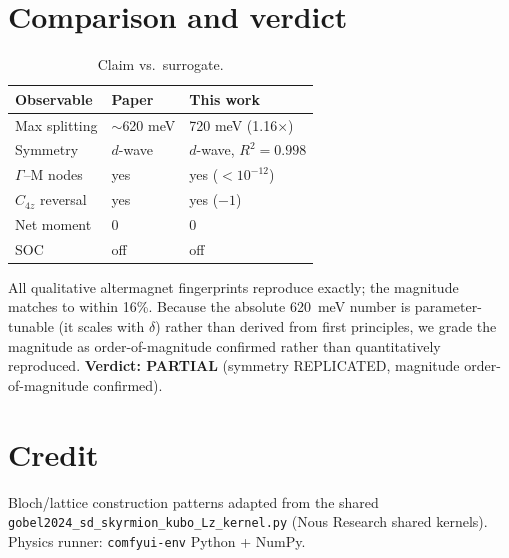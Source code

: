 \documentclass[aps,prb,twocolumn,superscriptaddress,floatfix]{revtex4-2}
\begin{document}
\section{Comparison and verdict}
\begin{table}[h]
\caption{Claim vs.\ surrogate.}
\begin{ruledtabular}
\begin{tabular}{lll}
Observable & Paper & This work \\\hline
Max splitting & $\sim$620 meV & 720 meV (1.16$\times$) \\
Symmetry & $d$-wave & $d$-wave, $R^2{=}0.998$ \\
$\Gamma$--M nodes & yes & yes ($<10^{-12}$) \\
$C_{4z}$ reversal & yes & yes ($-1$) \\
Net moment & 0 & 0 \\
SOC & off & off \\
\end{tabular}
\end{ruledtabular}
\end{table}
All qualitative altermagnet fingerprints reproduce exactly; the magnitude
matches to within 16\%. Because the absolute 620~meV number is
parameter-tunable (it scales with $\delta$) rather than derived from first
principles, we grade the magnitude as order-of-magnitude confirmed rather than
quantitatively reproduced. \textbf{Verdict: PARTIAL} (symmetry REPLICATED,
magnitude order-of-magnitude confirmed).

\section{Credit}
Bloch/lattice construction patterns adapted from the shared
\texttt{gobel2024\_sd\_skyrmion\_kubo\_Lz\_kernel.py} (Nous Research shared
kernels). Physics runner: \texttt{comfyui-env} Python + NumPy.
\end{document}
